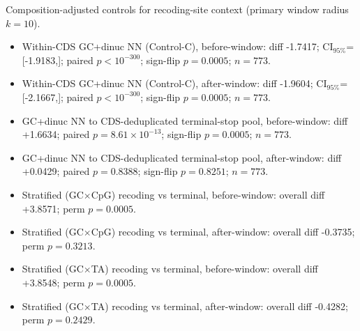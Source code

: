 Composition-adjusted controls for recoding-site context (primary window radius $k=10$).

\begin{itemize}
\item Within-CDS GC+dinuc NN (Control-C), before-window: diff -1.7417; CI$_{95\%}$=[-1.9183,]; paired $p<10^{-300}$; sign-flip $p=0.0005$; $n=773$.
\item Within-CDS GC+dinuc NN (Control-C), after-window: diff -1.9604; CI$_{95\%}$=[-2.1667,]; paired $p<10^{-300}$; sign-flip $p=0.0005$; $n=773$.
\item GC+dinuc NN to CDS-deduplicated terminal-stop pool, before-window: diff +1.6634; paired $p=8.61\times 10^{-13}$; sign-flip $p=0.0005$; $n=773$.
\item GC+dinuc NN to CDS-deduplicated terminal-stop pool, after-window: diff +0.0429; paired $p=0.8388$; sign-flip $p=0.8251$; $n=773$.
\item Stratified (GC$\times$CpG) recoding vs terminal, before-window: overall diff +3.8571; perm $p=0.0005$.
\item Stratified (GC$\times$CpG) recoding vs terminal, after-window: overall diff -0.3735; perm $p=0.3213$.
\item Stratified (GC$\times$TA) recoding vs terminal, before-window: overall diff +3.8548; perm $p=0.0005$.
\item Stratified (GC$\times$TA) recoding vs terminal, after-window: overall diff -0.4282; perm $p=0.2429$.
\end{itemize}
